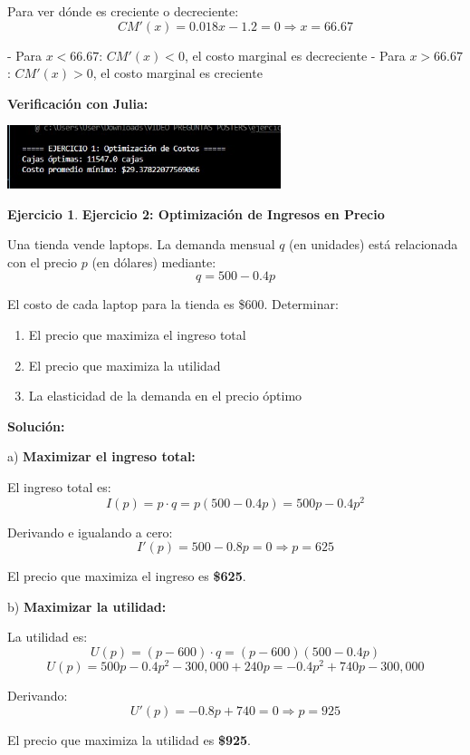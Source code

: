 \documentclass[12pt, a4paper, oneside]{book}
\theoremstyle{definition}
\newtheorem{ejercicio}{Ejercicio}[chapter]
\begin{document}
Para ver dónde es creciente o decreciente:
$$CM'(x) = 0.018x - 1.2 = 0 \Rightarrow x = 66.67$$

- Para $x < 66.67$: $CM'(x) < 0$, el costo marginal es decreciente
- Para $x > 66.67$: $CM'(x) > 0$, el costo marginal es creciente

\textbf{Verificación con Julia:}


\begin{center}
\includegraphics[width=0.6\textwidth]{ejercicio1fm.png}
\end{center}

\begin{ejercicio}
\textbf{Ejercicio 2: Optimización de Ingresos en Precio}

Una tienda vende laptops. La demanda mensual $q$ (en unidades) está relacionada con el precio $p$ (en dólares) mediante:
$$q = 500 - 0.4p$$

El costo de cada laptop para la tienda es \$600. Determinar:
\begin{enumerate}[label=\alph*)]
    \item El precio que maximiza el ingreso total
    \item El precio que maximiza la utilidad
    \item La elasticidad de la demanda en el precio óptimo
\end{enumerate}
\end{ejercicio}

\textbf{Solución:}

a) \textbf{Maximizar el ingreso total:}

El ingreso total es:
$$I(p) = p \cdot q = p(500 - 0.4p) = 500p - 0.4p^2$$

Derivando e igualando a cero:
$$I'(p) = 500 - 0.8p = 0 \Rightarrow p = 625$$

El precio que maximiza el ingreso es \textbf{\$625}.

b) \textbf{Maximizar la utilidad:}

La utilidad es:
$$U(p) = (p - 600) \cdot q = (p - 600)(500 - 0.4p)$$
$$U(p) = 500p - 0.4p^2 - 300,000 + 240p = -0.4p^2 + 740p - 300,000$$

Derivando:
$$U'(p) = -0.8p + 740 = 0 \Rightarrow p = 925$$

El precio que maximiza la utilidad es \textbf{\$925}.
\end{document}
